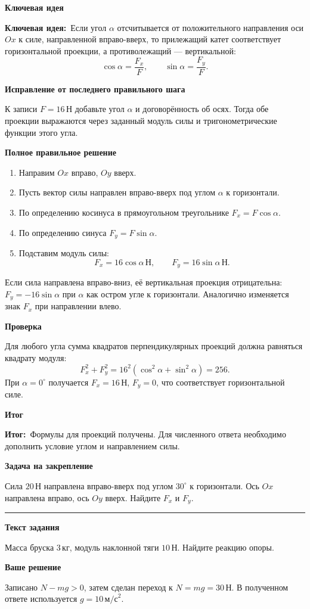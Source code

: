 \documentclass[a4paper,12pt]{article}
\newcommand{\reviewtitle}[1]{\noindent{\Large\bfseries\color{deepaccent}Задание №#1}\par\vspace{2mm}\noindent\rule{\linewidth}{0.35pt}\vspace{2mm}}
\newcommand{\subblock}[1]{\par\medskip\textbf{\color{deepaccent}#1}\par\vspace{-2pt}}
\newcommand{\keyidea}{\textcolor{ideablue}{\textbf{Ключевая идея:}}}
\newcommand{\resultlabel}{\textcolor{deepaccent}{\textbf{Итог:}}}
\begin{document}
\subblock{Ключевая идея}
\keyidea\ Если угол $\alpha$ отсчитывается от положительного направления оси $Ox$ к силе, направленной вправо-вверх, то прилежащий катет соответствует горизонтальной проекции, а противолежащий --- вертикальной:
\[
\cos\alpha=\frac{F_x}{F},\qquad
\sin\alpha=\frac{F_y}{F}.
\]

\subblock{Исправление от последнего правильного шага}
К записи $F=16\,\text{Н}$ добавьте угол $\alpha$ и договорённость об осях. Тогда обе проекции выражаются через заданный модуль силы и тригонометрические функции этого угла.

\subblock{Полное правильное решение}
\begin{enumerate}
\item Направим $Ox$ вправо, $Oy$ вверх.
\item Пусть вектор силы направлен вправо-вверх под углом $\alpha$ к горизонтали.
\item По определению косинуса в прямоугольном треугольнике $F_x=F\cos\alpha$.
\item По определению синуса $F_y=F\sin\alpha$.
\item Подставим модуль силы:
\[
\boxed{F_x=16\cos\alpha\,\text{Н}},\qquad
\boxed{F_y=16\sin\alpha\,\text{Н}}.
\]
\end{enumerate}
Если сила направлена вправо-вниз, её вертикальная проекция отрицательна: $F_y=-16\sin\alpha$ при $\alpha$ как остром угле к горизонтали. Аналогично изменяется знак $F_x$ при направлении влево.

\subblock{Проверка}
Для любого угла сумма квадратов перпендикулярных проекций должна равняться квадрату модуля:
\[
F_x^2+F_y^2=16^2(\cos^2\alpha+\sin^2\alpha)=256.
\]
При $\alpha=0^\circ$ получается $F_x=16\,\text{Н}$, $F_y=0$, что соответствует горизонтальной силе.

\subblock{Итог}
\resultlabel\ Формулы для проекций получены. Для численного ответа необходимо дополнить условие углом и направлением силы.

\subblock{Задача на закрепление}
Сила $20\,\text{Н}$ направлена вправо-вверх под углом $30^\circ$ к горизонтали. Ось $Ox$ направлена вправо, ось $Oy$ вверх. Найдите $F_x$ и $F_y$.

\clearpage
{}\label{task:2}
\reviewtitle{2}
\subblock{Текст задания}
Масса бруска $3\,\text{кг}$, модуль наклонной тяги $10\,\text{Н}$. Найдите реакцию опоры.

\subblock{Ваше решение}
Записано $N-mg>0$, затем сделан переход к $N=mg=30\,\text{Н}$. В полученном ответе используется $g=10\,\text{м/с}^2$.
\end{document}
